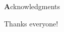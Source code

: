 
\vspace*{2cm}

\begin{center}
{ \textbf Acknowledgments}
\end{center}

\vspace{1cm}
\noindent
Thanks everyone!
\cleardoublepage{}
